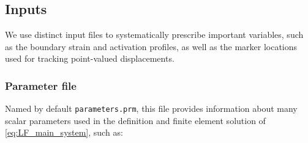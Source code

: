\documentclass{sfuthesis}
\numberwithin{equation}{section}
\numberwithin{figure}{chapter}
\numberwithin{table}{chapter}
\theoremstyle{definition}
\begin{document}
\subsection{Inputs}

We use distinct input files to systematically prescribe important variables, such as the boundary strain and activation profiles, as well as the marker locations used for tracking point-valued displacements.

\subsubsection{Parameter file}

Named by default \texttt{parameters.prm}, this file provides information about many scalar parameters used in the definition and finite element solution of \eqref{eq:LF_main_system}, such as:
\end{document}
